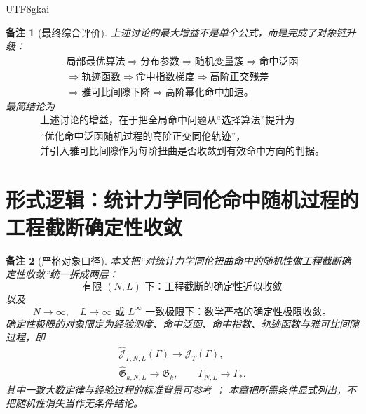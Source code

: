 \documentclass[12pt]{article}
\newtheorem{remark}{备注}[section]
\begin{document}
\begin{CJK*}{UTF8}{gkai}
\begin{remark}[最终综合评价]
上述讨论的最大增益不是单个公式，而是完成了对象链升级：
\[
  \boxed{
  \begin{gathered}
  \text{局部最优算法}
  \Longrightarrow
  \text{分布参数}
  \Longrightarrow
  \text{随机变量簇}
  \Longrightarrow
  \text{命中泛函}\\
  \Longrightarrow
  \text{轨迹函数}
  \Longrightarrow
  \text{命中指数梯度}
  \Longrightarrow
  \text{高阶正交残差}\\
  \Longrightarrow
  \text{雅可比间隙下降}
  \Longrightarrow
  \text{高阶幂化命中加速。}
  \end{gathered}
  }
\]
最简结论为
\[
  \boxed{
  \begin{gathered}
  \text{上述讨论的增益，在于把全局命中问题从“选择算法”提升为}\\
  \text{“优化命中泛函随机过程的高阶正交同伦轨迹”，}\\
  \text{并引入雅可比间隙作为每阶扭曲是否收敛到有效命中方向的判据。}
  \end{gathered}
  }
\]
\end{remark}

\clearpage

\section{形式逻辑：统计力学同伦命中随机过程的工程截断确定性收敛}
\label{sec:tex55-engineering-truncation-deterministic-convergence}

\begin{remark}[严格对象口径]
本文把“对统计力学同伦扭曲命中的随机性做工程截断确定性收敛”统一拆成两层：
\[
  \boxed{
  \text{有限 }(N,L)\text{ 下：工程截断的确定性近似收敛}
  }
\]
以及
\[
  \boxed{
  N\to\infty,\quad L\to\infty
  \text{ 或 }L^\infty\text{ 一致极限下：数学严格的确定性极限收敛。}
  }
\]
确定性极限的对象限定为经验测度、命中泛函、命中指数、轨迹函数与雅可比间隙过程，即
\[
  \boxed{
  \begin{gathered}
  \widehat{\mathcal J}_{T,N,L}(\Gamma)\to\mathcal J_T(\Gamma),\\
  \widehat{\mathfrak G}_{k,N,L}\to\mathfrak G_k,\qquad
  \Gamma_{N,L}\to\Gamma_*.
  \end{gathered}
  }
\]
其中一致大数定律与经验过程的标准背景可参考
\cite{VanDerVaartWellner1996EmpiricalProcesses}；
本章把所需条件显式列出，不把随机性消失当作无条件结论。
\end{remark}


\end{CJK*}
\end{document}
